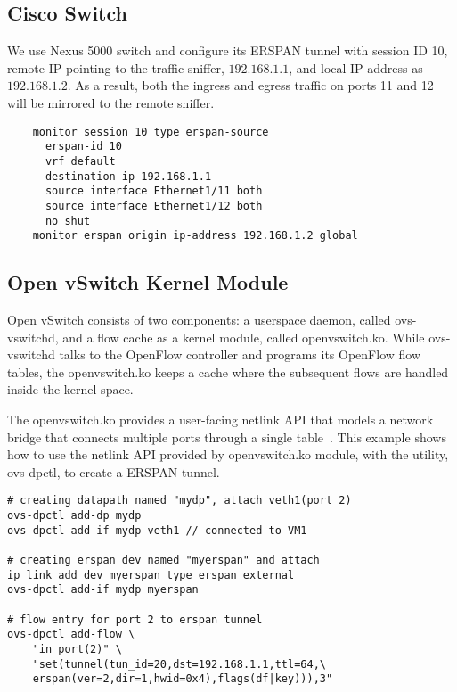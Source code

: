 \documentclass{sigplanconf}
\begin{document}
\subsection{Cisco Switch}
We use Nexus 5000 switch and configure its ERSPAN tunnel
with session ID 10, remote IP pointing to the traffic sniffer, $192.168.1.1$,
and local IP address as $192.168.1.2$.  As a result, both the ingress and
egress traffic on ports 11 and 12 will be mirrored to the remote sniffer.
\begin{verbatim}
    monitor session 10 type erspan-source
      erspan-id 10
      vrf default
      destination ip 192.168.1.1
      source interface Ethernet1/11 both
      source interface Ethernet1/12 both
      no shut
    monitor erspan origin ip-address 192.168.1.2 global
\end{verbatim}


\subsection{Open vSwitch Kernel Module}\label{ovs}
Open vSwitch consists of two components: a userspace daemon, called ovs-vswitchd,
and a flow cache as a kernel module, called openvswitch.ko.  While ovs-vswitchd
talks to the OpenFlow controller and programs its OpenFlow flow tables,
the openvswitch.ko keeps a cache where the subsequent flows are handled
inside the kernel space.

The openvswitch.ko provides a user-facing netlink API that models a network
bridge that connects multiple ports through a single table~\cite{ovswoovs}.
This example shows how to use the netlink API provided by openvswitch.ko
module, with the utility, ovs-dpctl, to create a ERSPAN tunnel.
\begin{verbatim}
# creating datapath named "mydp", attach veth1(port 2)
ovs-dpctl add-dp mydp
ovs-dpctl add-if mydp veth1 // connected to VM1

# creating erspan dev named "myerspan" and attach
ip link add dev myerspan type erspan external
ovs-dpctl add-if mydp myerspan

# flow entry for port 2 to erspan tunnel 
ovs-dpctl add-flow \
    "in_port(2)" \
    "set(tunnel(tun_id=20,dst=192.168.1.1,ttl=64,\
    erspan(ver=2,dir=1,hwid=0x4),flags(df|key))),3"
\end{verbatim}

\end{document}
